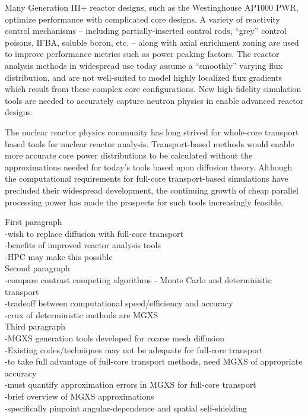 Many Generation III+ reactor designs, such as the Westinghouse AP1000 \ac{PWR}, optimize performance with complicated core designs. A variety of reactivity control mechanisms -- including partially-inserted control rods, ``grey'' control poisons, \ac{IFBA}, soluble boron, etc. -- along with axial enrichment zoning are used to improve performance metrics such as power peaking factors. The reactor analysis methods in widespread use today assume a ``smoothly'' varying flux distribution, and are not well-suited to model highly localized flux gradients which result from these complex core configurations. New high-fidelity simulation tools are needed to accurately capture neutron physics in enable advanced reactor designs.

The nuclear reactor physics community has long strived for whole-core transport based tools for nuclear reactor analysis. Transport-based methods would enable more accurate core power distributions to be calculated without the approximations needed for today’s tools based upon diffusion theory. Although the computational requirements for full-core transport-based simulations have precluded their widespread development, the continuing growth of cheap parallel processing power has made the prospects for such tools increasingly feasible.


First paragraph\\
-wish to replace diffusion with full-core transport\\
-benefits of improved reactor analysis tools\\
-HPC may make this possible\\

Second paragraph\\
-compare contrast competing algorithms - Monte Carlo and deterministic transport\\
-tradeoff between computational speed/efficiency and accuracy\\
-crux of deterministic methods are MGXS\\

Third paragraph\\
-MGXS generation tools developed for coarse mesh diffusion\\
-Existing codes/techniques may not be adequate for full-core transport\\
-to take full advantage of full-core transport methods, need MGXS of appropriate accuracy\\
-must quantify approximation errors in MGXS for full-core transport \\
-brief overview of MGXS approximations\\
-specifically pinpoint angular-dependence and spatial self-shielding\\

